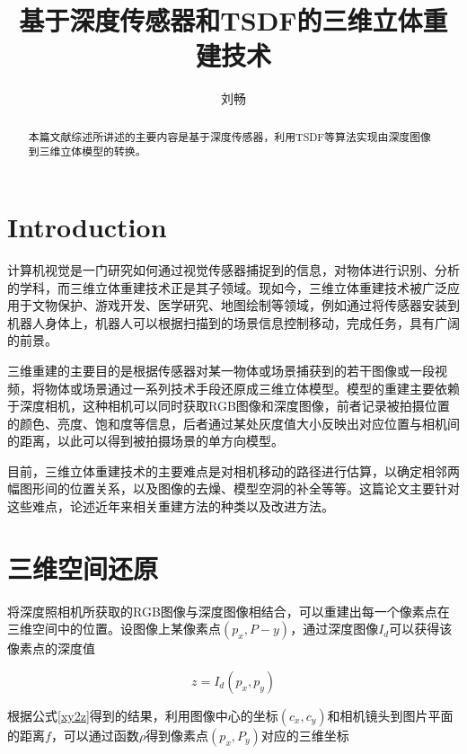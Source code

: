 \documentclass{llncs}
\begin{document}
\begin{CJK}{UTF8}{song}
\title{基于深度传感器和TSDF的三维立体重建技术}
\author{刘畅}
\maketitle

\begin{abstract}
本篇文献综述所讲述的主要内容是基于深度传感器，利用TSDF等算法实现由深度图像到三维立体模型的转换。
\end{abstract}

\section{Introduction}

计算机视觉是一门研究如何通过视觉传感器捕捉到的信息，对物体进行识别、分析的学科，而三维立体重建技术正是其子领域。现如今，三维立体重建技术被广泛应用于文物保护、游戏开发、医学研究、地图绘制等领域，例如通过将传感器安装到机器人身体上，机器人可以根据扫描到的场景信息控制移动，完成任务，具有广阔的前景。

三维重建的主要目的是根据传感器对某一物体或场景捕获到的若干图像或一段视频，将物体或场景通过一系列技术手段还原成三维立体模型。模型的重建主要依赖于深度相机，这种相机可以同时获取RGB图像和深度图像，前者记录被拍摄位置的颜色、亮度、饱和度等信息，后者通过某处灰度值大小反映出对应位置与相机间的距离，以此可以得到被拍摄场景的单方向模型。

目前，三维立体重建技术的主要难点是对相机移动的路径进行估算，以确定相邻两幅图形间的位置关系，以及图像的去燥、模型空洞的补全等等。这篇论文主要针对这些难点，论述近年来相关重建方法的种类以及改进方法。

\section{三维空间还原}

将深度照相机所获取的RGB图像与深度图像相结合，可以重建出每一个像素点在三维空间中的位置。设图像上某像素点$(p_x,P-y)$，通过深度图像$I_d$可以获得该像素点的深度值

\begin{equation}
\label{xy2z}
	z = I_d(p_x,p_y)
\end{equation}

根据公式\ref{xy2z}得到的结果，利用图像中心的坐标$(c_x,c_y)$和相机镜头到图片平面的距离$f$，可以通过函数$\rho$得到像素点$(p_x,P_y)$对应的三维坐标


\end{CJK}
\end{document}
